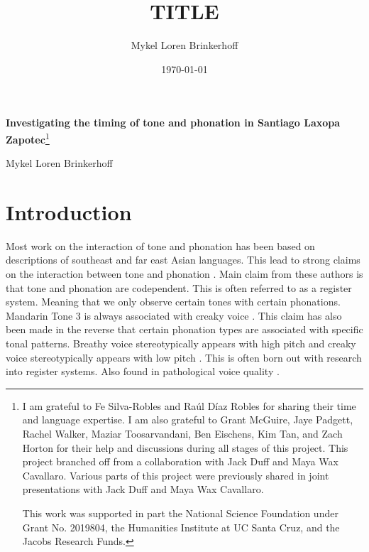 \documentclass[12pt, letterpaper]{article}
\title{TITLE}
\author{Mykel Loren Brinkerhoff}
\date{\today}
\begin{document}
	
	
	
\begin{center}
	{\Large \textbf{Investigating the timing of tone and phonation in Santiago Laxopa Zapotec}}\footnote{I am grateful to Fe Silva-Robles and  Raúl Díaz Robles for sharing their time and language expertise. I am also grateful to Grant McGuire,  Jaye Padgett, Rachel Walker, Maziar Toosarvandani, Ben Eischens, Kim Tan, and Zach Horton for their help and discussions during all stages of this project. This project branched off from a collaboration with  Jack Duff and Maya Wax Cavallaro. Various parts of this project were previously shared in joint presentations with Jack Duff and Maya Wax Cavallaro.
	
	This work was supported in part the National Science Foundation under Grant No. 2019804, the Humanities Institute at UC Santa Cruz, and the Jacobs Research Funds.}
	\vspace{6pt}

	Mykel Loren Brinkerhoff
\end{center}
\thispagestyle{fancy}



\section{Introduction} \label{sec:Introduction}


Most work on the interaction of tone and phonation has been based on descriptions of southeast and far east Asian languages.
This lead to strong claims on the interaction between tone and phonation \citep{masicaDefiningLinguisticArea1976,thurgoodVietnameseTonogenesisRevising2002,yipTone2002,enfieldArealLinguisticsMainland2005,michaudComplexTonesEast2012,brunelleTonePhonationSoutheast2016}.
Main claim from these authors is that tone and phonation are codependent. This is often referred to as a register system.  
Meaning that we only observe certain tones with certain phonations. 
Mandarin Tone 3 is always associated with creaky voice \citep{duanmuPhonologyStandardChinese2007}.
This claim has also been made in the reverse that certain phonation types are associated with specific tonal patterns. 
Breathy voice stereotypically appears with high pitch and creaky voice stereotypically appears with low pitch \citep{eslingVoiceQualityLaryngeal2019}.
This is often born out with research into register systems. 
Also found in pathological voice quality \citep{klattAnalysisSynthesisPerception1990,titzePrinciplesVoiceProduction2000,eslingVoiceQualityLaryngeal2019}.
\end{document}
